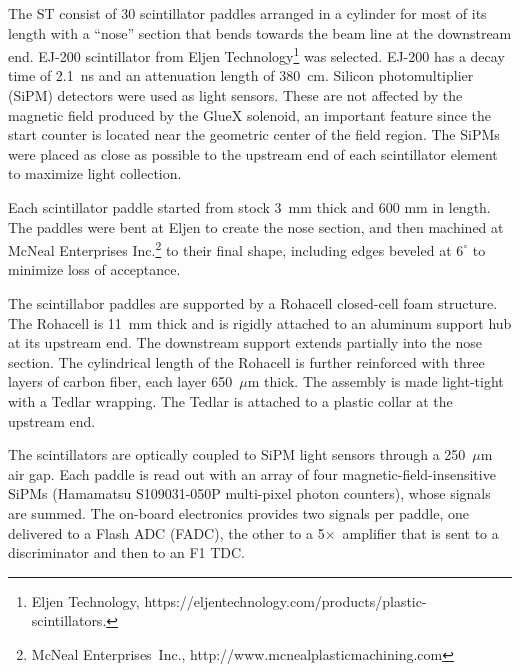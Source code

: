 The ST consist of 30 scintillator paddles arranged in a cylinder for
most of its length with a ``nose'' section that bends towards the beam
line at the downstream end. EJ-200 scintillator from Eljen
Technology\footnote{Eljen Technology,
  https://eljentechnology.com/products/plastic-scintillators.} was
selected. EJ-200 has a decay time of 2.1~ns and an attenuation length
of 380~cm. Silicon photomultiplier (SiPM) detectors were used as light
sensors. These are not affected by the magnetic field produced by the
GlueX solenoid, an important feature since the start counter is located
near the geometric center of the field region. The SiPMs were placed
as close as possible to the upstream end of each scintillator element
to maximize light collection.

Each scintillator paddle started from stock 3~mm thick and 600 mm in
length. The paddles were bent at Eljen to create the nose section, and then machined at McNeal Enterprises Inc.\footnote{McNeal
  Enterprises~Inc., http://www.mcnealplasticmachining.com} to their
final shape, including edges beveled at $6^\circ$ to minimize loss of
acceptance.

The scintillabor paddles are supported by a Rohacell closed-cell foam
structure. The Rohacell is 11~mm thick and is rigidly attached to an
aluminum support hub at its upstream end. The downstream support
extends partially into the nose section. The cylindrical length of the Rohacell is further reinforced with three layers of carbon fiber, each layer 650~$\mu$m thick. The assembly is made light-tight with a Tedlar wrapping. The Tedlar is attached to a plastic collar at the upstream end.

The scintillators are optically coupled to SiPM light sensors through a 250~$\mu$m air gap. Each paddle is read out with an array of four 
magnetic-field-insensitive SiPMs (Hamamatsu S109031-050P multi-pixel photon counters), whose signals are summed. 
The on-board electronics provides two signals per paddle, one delivered to a Flash ADC (FADC), the other to a 5$\times$~amplifier that is sent to a discriminator and then to an F1 TDC. 

